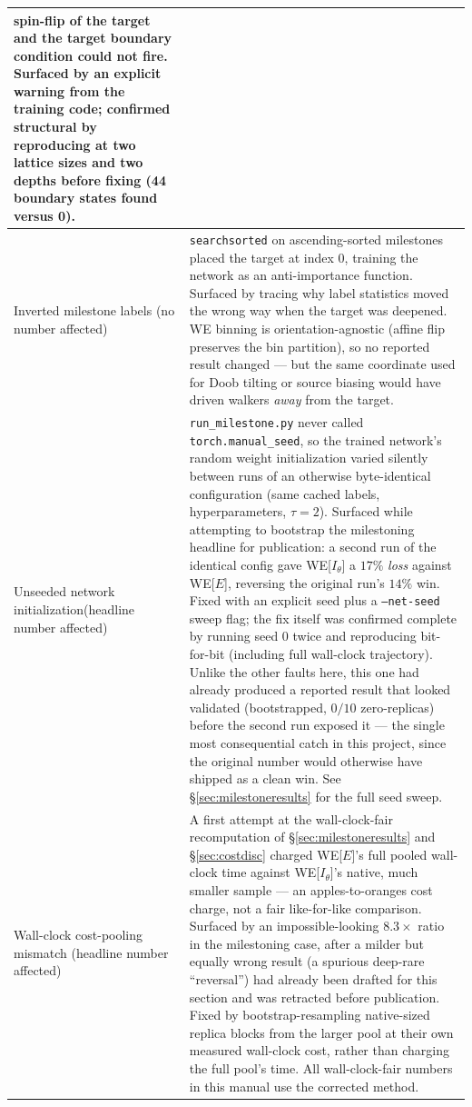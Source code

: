 \documentclass[11pt,a4paper]{article}
\begin{document}
\begin{table}[H]
\begin{tabular}{p{2.5cm}p{11.6cm}}
spin-flip of the target and the target boundary condition could not fire. Surfaced by an explicit
warning from the training code; confirmed structural by reproducing at two lattice sizes and two
depths before fixing (44 boundary states found versus 0).\\\midrule
Inverted milestone labels
\textcolor{green!45!black}{(no number affected)} &
\texttt{searchsorted} on ascending-sorted milestones placed the target at index 0, training the
network as an anti-importance function. Surfaced by tracing why label statistics moved the wrong
way when the target was deepened. WE binning is orientation-agnostic (affine flip preserves the
bin partition), so no reported result changed --- but the same coordinate used for Doob tilting
or source biasing would have driven walkers \emph{away} from the target.\\\midrule
Unseeded network initialization\label{man:seedbug}
\textcolor{red!55!black}{(headline number affected)} &
\texttt{run\_milestone.py} never called \texttt{torch.manual\_seed}, so the trained network's
random weight initialization varied silently between runs of an otherwise byte-identical
configuration (same cached labels, hyperparameters, $\tau=2$). Surfaced while attempting to
bootstrap the milestoning headline for publication: a second run of the identical config gave
WE[$I_\theta$] a $17\%$ \emph{loss} against WE[$E$], reversing the original run's $14\%$ win.
Fixed with an explicit seed plus a \texttt{--net-seed} sweep flag; the fix itself was confirmed
complete by running seed 0 twice and reproducing bit-for-bit (including full wall-clock
trajectory). Unlike the other faults here, this one had already produced a reported result that
looked validated (bootstrapped, $0/10$ zero-replicas) before the second run exposed it --- the
single most consequential catch in this project, since the original number would otherwise have
shipped as a clean win. See \S\ref{sec:milestoneresults} for the full seed sweep.\\\midrule
Wall-clock cost-pooling mismatch
\textcolor{red!55!black}{(headline number affected)} &
A first attempt at the wall-clock-fair recomputation of \S\ref{sec:milestoneresults} and
\S\ref{sec:costdisc} charged WE[$E$]'s full pooled wall-clock time against WE[$I_\theta$]'s
native, much smaller sample --- an apples-to-oranges cost charge, not a fair like-for-like
comparison. Surfaced by an impossible-looking $8.3\times$ ratio in the milestoning case, after a
milder but equally wrong result (a spurious deep-rare ``reversal'') had already been drafted for
this section and was retracted before publication. Fixed by bootstrap-resampling native-sized
replica blocks from the larger pool at their own measured wall-clock cost, rather than charging
the full pool's time. All wall-clock-fair numbers in this manual use the corrected method.\\
\bottomrule\end{tabular}
\end{table}
\end{document}
